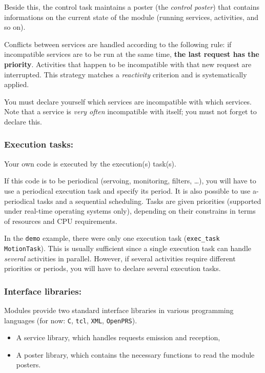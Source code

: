 Beside    this, the control task  maintains   a poster  (the \emph{control
poster}) that contains informations on   the current state of the  module
(running services, activities, and so on).

Conflicts between services are   handled  according to the following  rule:  if
incompatible  services are to  be run  at the  same  time, \textbf{the last
request   has  the  priority}. Activities    that  happen to  be
incompatible  with that new request are  interrupted. This strategy matches a
\emph{reactivity} criterion and is systematically applied.

You must  declare  yourself which  services  are incompatible with  which
services. Note that   a service is  \emph{very often}  incompatible  with
itself; you must not forget to declare this.


\subsubsection{Execution tasks:}

Your own code is executed by the execution(s) task(s).

If  this code is to  be periodical (servoing,  monitoring, filters, \ldots),
you will have to use a periodical  execution task and specify its period.
It   is  also  possible   to use   a-periodical  tasks  and  a  sequential
scheduling. Tasks are  given priorities (supported under real-time
operating systems only),
depending on their constrains in terms of resources and CPU requirements.

In the  \texttt{demo} example,  there were  only one  execution  task 
(\texttt{exec\_task MotionTask}). 
This   is  usually  sufficient since  a   single
execution task can handle \emph{several}  activities in parallel. However,
if several  activities require different  priorities or periods, you will
have to declare several execution tasks.


\subsubsection{Interface libraries:}

Modules provide two standard interface libraries in various programming
languages (for now: \texttt{C}, \texttt{tcl}, \texttt{XML}, \texttt{OpenPRS}).

\begin{itemize}
\item A service library, which handles requests emission and reception,
\item A poster library, which contains the necessary functions to read
the module posters.
\end{itemize}


